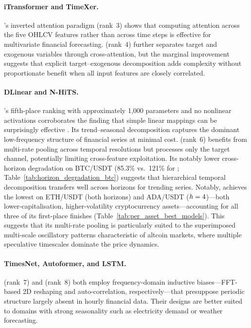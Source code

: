 \paragraph{iTransformer and TimeXer.}
\itransformer's inverted attention paradigm (rank~3) shows that computing attention across the five OHLCV features rather than across time steps is effective for multivariate financial forecasting.  \timexer (rank~4) further separates target and exogenous variables through cross-attention, but the marginal improvement suggests that explicit target--exogenous decomposition adds complexity without proportionate benefit when all input features are closely correlated.

\paragraph{DLinear and N-HiTS.}
\dlinear's fifth-place ranking with approximately 1{,}000 parameters and no nonlinear activations corroborates the finding that simple linear mappings can be surprisingly effective \citep{Zeng2023}.  Its trend--seasonal decomposition captures the dominant low-frequency structure of financial series at minimal cost.  \nhits (rank~6) benefits from multi-rate pooling across temporal resolutions but processes only the target channel, potentially limiting cross-feature exploitation.  Its notably lower cross-horizon degradation on BTC/USDT (85.3\% vs.\ 121\% for \moderntcn; Table~\ref{tab:horizon_degradation_btc}) suggests that hierarchical temporal decomposition transfers well across horizons for trending series.  Notably, \nhits achieves the lowest \rmse on ETH/USDT (both horizons) and ADA/USDT ($h=4$)---both lower-capitalisation, higher-volatility cryptocurrency assets---accounting for all three of its first-place finishes (Table~\ref{tab:per_asset_best_models}).  This suggests that its multi-rate pooling is particularly suited to the superimposed multi-scale oscillatory patterns characteristic of altcoin markets, where multiple speculative timescales dominate the price dynamics.

\paragraph{TimesNet, Autoformer, and LSTM.}
\timesnet (rank~7) and \autoformer (rank~8) both employ frequency-domain inductive biases---FFT-based 2D reshaping and auto-correlation, respectively---that presuppose periodic structure largely absent in hourly financial data.  Their designs are better suited to domains with strong seasonality such as electricity demand or weather forecasting.

